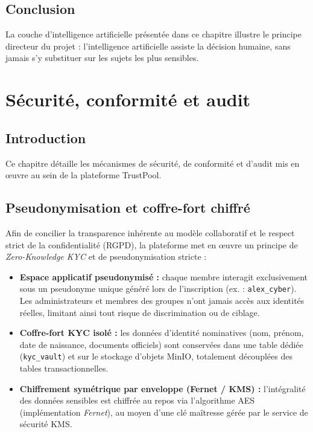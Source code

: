 \documentclass[12pt,a4paper]{report}
\begin{document}
\section{Conclusion}
La couche d'intelligence artificielle présentée dans ce chapitre illustre le principe directeur du projet : l'intelligence artificielle assiste la décision humaine, sans jamais s'y substituer sur les sujets les plus sensibles.

\newpage

\chapter{Sécurité, conformité et audit}

\section{Introduction}
Ce chapitre détaille les mécanismes de sécurité, de conformité et d'audit mis en œuvre au sein de la plateforme TrustPool.

\section{Pseudonymisation et coffre-fort chiffré}
Afin de concilier la transparence inhérente au modèle collaboratif et le respect strict de la confidentialité (RGPD), la plateforme met en œuvre un principe de \textit{Zero-Knowledge KYC} et de pseudonymisation stricte :
\begin{itemize}
    \item \textbf{Espace applicatif pseudonymisé :} chaque membre interagit exclusivement sous un pseudonyme unique généré lors de l'inscription (ex. : \texttt{alex\_cyber}). Les administrateurs et membres des groupes n'ont jamais accès aux identités réelles, limitant ainsi tout risque de discrimination ou de ciblage.
    \item \textbf{Coffre-fort KYC isolé :} les données d'identité nominatives (nom, prénom, date de naissance, documents officiels) sont conservées dans une table dédiée (\texttt{kyc\_vault}) et sur le stockage d'objets MinIO, totalement découplées des tables transactionnelles.
    \item \textbf{Chiffrement symétrique par enveloppe (Fernet / KMS) :} l'intégralité des données sensibles est chiffrée au repos via l'algorithme AES (implémentation \textit{Fernet}), au moyen d'une clé maîtresse gérée par le service de sécurité KMS.
\end{itemize}
\end{document}
